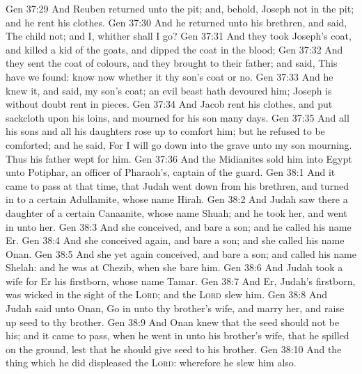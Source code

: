 \vs Gen 37:29 And Reuben returned unto the pit; and, behold, Joseph  not in the pit; and he rent his clothes.
\vs Gen 37:30 And he returned unto his brethren, and said, The child  not; and I, whither shall I go?
\vs Gen 37:31 And they took Joseph's coat, and killed a kid of the goats, and dipped the coat in the blood;
\vs Gen 37:32 And they sent the coat of  colours, and they brought  to their father; and said, This have we found: know now whether it  thy son's coat or no.
\vs Gen 37:33 And he knew it, and said,  my son's coat; an evil beast hath devoured him; Joseph is without doubt rent in pieces.
\vs Gen 37:34 And Jacob rent his clothes, and put sackcloth upon his loins, and mourned for his son many days.
\vs Gen 37:35 And all his sons and all his daughters rose up to comfort him; but he refused to be comforted; and he said, For I will go down into the grave unto my son mourning. Thus his father wept for him.
\vs Gen 37:36 And the Midianites sold him into Egypt unto Potiphar, an officer of Pharaoh's,  captain of the guard.
\vs Gen 38:1 And it came to pass at that time, that Judah went down from his brethren, and turned in to a certain Adullamite, whose name  Hirah.
\vs Gen 38:2 And Judah saw there a daughter of a certain Canaanite, whose name  Shuah; and he took her, and went in unto her.
\vs Gen 38:3 And she conceived, and bare a son; and he called his name Er.
\vs Gen 38:4 And she conceived again, and bare a son; and she called his name Onan.
\vs Gen 38:5 And she yet again conceived, and bare a son; and called his name Shelah: and he was at Chezib, when she bare him.
\vs Gen 38:6 And Judah took a wife for Er his firstborn, whose name  Tamar.
\vs Gen 38:7 And Er, Judah's firstborn, was wicked in the sight of the \textsc{Lord}; and the \textsc{Lord} slew him.
\vs Gen 38:8 And Judah said unto Onan, Go in unto thy brother's wife, and marry her, and raise up seed to thy brother.
\vs Gen 38:9 And Onan knew that the seed should not be his; and it came to pass, when he went in unto his brother's wife, that he spilled  on the ground, lest that he should give seed to his brother.
\vs Gen 38:10 And the thing which he did displeased the \textsc{Lord}: wherefore he slew him also.
